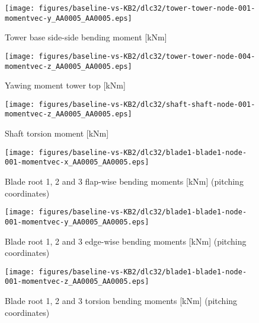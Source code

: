 \begin{figure}[!ht]
\begin{center}
	\texttt{[image: figures/baseline-vs-KB2/dlc32/tower-tower-node-001-momentvec-y\_AA0005\_AA0005.eps]}
\end{center}
\caption{Tower base side-side bending moment [kNm]}
\label{fig:baseline-vs-KB2:dlc32:tower-base-ss}
\end{figure}

\begin{figure}[!ht]
\begin{center}
	\texttt{[image: figures/baseline-vs-KB2/dlc32/tower-tower-node-004-momentvec-z\_AA0005\_AA0005.eps]}
\end{center}
\caption{Yawing moment tower top [kNm]}
\label{fig:baseline-vs-KB2:dlc32:tower-top-yaw}
\end{figure}

\begin{figure}[!ht]
\begin{center}
	\texttt{[image: figures/baseline-vs-KB2/dlc32/shaft-shaft-node-001-momentvec-z\_AA0005\_AA0005.eps]}
\end{center}
\caption{Shaft torsion moment [kNm]}
\label{fig:baseline-vs-KB2:dlc32:shaft-torsion}
\end{figure}

\begin{figure}[!ht]
\begin{center}
	\texttt{[image: figures/baseline-vs-KB2/dlc32/blade1-blade1-node-001-momentvec-x\_AA0005\_AA0005.eps]}
\end{center}
\caption{Blade root 1, 2 and 3 flap-wise bending moments [kNm] (pitching coordinates)}
\label{fig:baseline-vs-KB2:dlc32:blade-root-flap}
\end{figure}

\begin{figure}[!ht]
\begin{center}
	\texttt{[image: figures/baseline-vs-KB2/dlc32/blade1-blade1-node-001-momentvec-y\_AA0005\_AA0005.eps]}
\end{center}
\caption{Blade root 1, 2 and 3 edge-wise bending moments [kNm] (pitching coordinates)}
\label{fig:baseline-vs-KB2:dlc32:blade-root-edge}
\end{figure}

\begin{figure}[!ht]
\begin{center}
	\texttt{[image: figures/baseline-vs-KB2/dlc32/blade1-blade1-node-001-momentvec-z\_AA0005\_AA0005.eps]}
\end{center}
\caption{Blade root 1, 2 and 3 torsion bending moments [kNm] (pitching coordinates)}
\label{fig:baseline-vs-KB2:dlc32:blade-root-torsion}
\end{figure}

